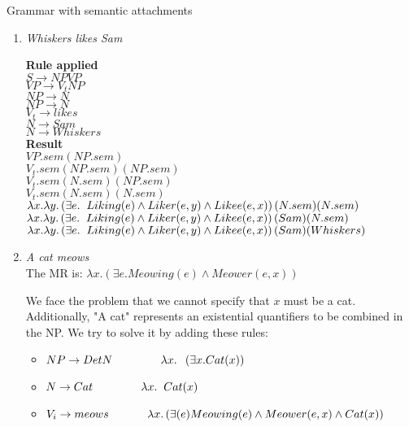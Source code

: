\documentclass[12pt]{article}
\newcommand{\lp}{\left(}
\newcommand{\rp}{\right)}
\newenvironment{exercise}[2][Exercise]{\begin{trivlist}
\item[\hskip \labelsep {\bfseries #1}\hskip \labelsep {\bfseries #2.}]}{\end{trivlist}}
\begin{document}
\begin{exercise}{5} Grammar with semantic attachments

\begin{enumerate}[label=(\alph*)]
\item \textit{Whiskers likes Sam}

\begin{vwcol}[widths={0.25,1.2}]
\textbf{Rule applied} \\
$S \rightarrow NP VP$\\
$VP \rightarrow V_t NP$\\
$NP \rightarrow N$ \\ 
$NP \rightarrow N$ \\ 
$V_t \rightarrow likes$ \\ 
$N \rightarrow Sam$ \\ 
$N \rightarrow Whiskers$ \\
\textbf{Result} \\
$VP.sem(NP.sem)$ \\
$V_t.sem(NP.sem)(NP.sem)$ \\
$V_t.sem(N.sem)(NP.sem)$ \\
$V_t.sem(N.sem)(N.sem)$ \\
$\lambda x. \lambda y. \lp \exists e. \hspace{0.2cm} Liking(e) \land Liker(e, y) \land Likee(e, x)\rp (N.sem)(N.sem)$ \\
$\lambda x. \lambda y. \lp \exists e. \hspace{0.2cm} Liking(e) \land Liker(e, y) \land Likee(e, x)\rp (Sam)(N.sem)$ \\
$\lambda x. \lambda y. \lp \exists e. \hspace{0.2cm} Liking(e) \land Liker(e, y) \land Likee(e, x)\rp (Sam)(Whiskers)$ \\
\end{vwcol}

\item \textit{A cat meows} \\
The MR is: $\lambda x.\lp \exists e. Meowing(e) \land Meower(e, x) \rp$ 

We face the problem that we cannot specify that $x$ must be a cat. Additionally, "A cat" represents an existential quantifiers to be combined in the NP. We try to solve it by adding these rules:

\begin{itemize}
\item $NP \rightarrow Det N \hspace{1.5cm} \lambda x. \hspace{0.2cm} \lp \exists x. Cat(x) \rp$ %
\item $N \rightarrow Cat \hspace{1.5cm} \lambda x. \hspace{0.2cm} Cat(x)$
\item $V_i \rightarrow meows \hspace{1.2cm} \lambda x. \lp \exists(e) Meowing(e) \land Meower(e,x) \land Cat(x) \rp$ \\
\end{itemize}


\end{enumerate}
\end{exercise}
\end{document}

